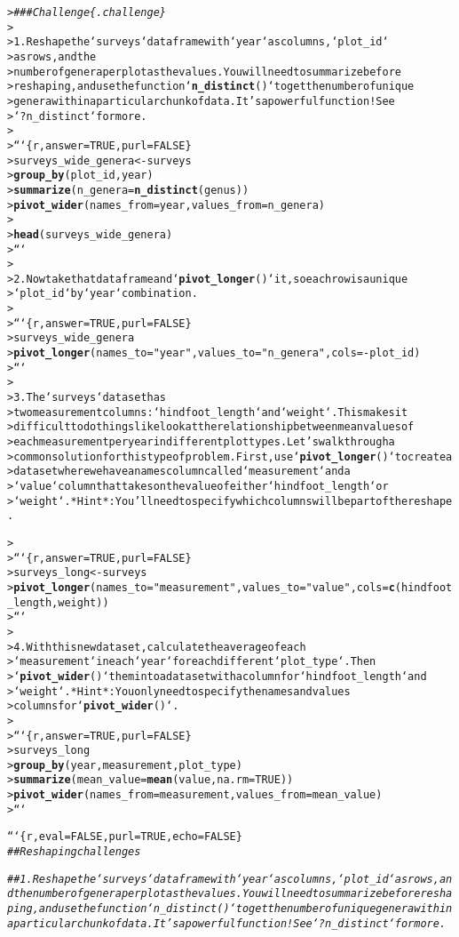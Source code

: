 \documentclass{article}\usepackage[]{graphicx}\usepackage[]{xcolor}
\makeatletter
\newcommand{\hlstr}[1]{\textcolor[rgb]{0.192,0.494,0.8}{#1}}%
\newcommand{\hlcom}[1]{\textcolor[rgb]{0.678,0.584,0.686}{\textit{#1}}}%
\newcommand{\hlkwd}[1]{\textcolor[rgb]{0.737,0.353,0.396}{\textbf{#1}}}%
\newenvironment{kframe}{%
 \def\at@end@of@kframe{}%
 \ifinner\ifhmode%
  \def\at@end@of@kframe{\end{minipage}}%
  \begin{minipage}{\columnwidth}%
 \fi\fi%
 \def\FrameCommand##1{\hskip\@totalleftmargin \hskip-\fboxsep
 \colorbox{shadecolor}{##1}\hskip-\fboxsep
     \hskip-\linewidth \hskip-\@totalleftmargin \hskip\columnwidth}%
 \MakeFramed {\advance\hsize-\width
   \@totalleftmargin\z@ \linewidth\hsize
   \@setminipage}}%
 {\par\unskip\endMakeFramed%
 \at@end@of@kframe}
\newenvironment{knitrout}{}{} %
\makeatother
\begin{document}
\begin{knitrout}
\begin{kframe}
\begin{alltt}
> \hlcom{### Challenge \{.challenge\}}
>
> 1. Reshape the `surveys` data frame with `year` as columns, `plot_id`
>   as rows, and the
>   number of genera per plot as the values. You will need to summarize before
>   reshaping, and use the function `\hlkwd{n_distinct}()` to get the number of unique
>   genera within a particular chunk of data. It's a powerful function! See
>   `?n_distinct` for more.
>
> ```\{r, answer=TRUE, purl=FALSE\}
> surveys_wide_genera <- surveys %>%
>   \hlkwd{group_by}(plot_id, year) %>%
>   \hlkwd{summarize}(n_genera = \hlkwd{n_distinct}(genus)) %>%
>   \hlkwd{pivot_wider}(names_from = year, values_from = n_genera)
>
> \hlkwd{head}(surveys_wide_genera)
> ```
>
> 2. Now take that data frame and `\hlkwd{pivot_longer}()` it, so each row is a unique
>    `plot_id` by `year` combination.
>
> ```\{r, answer=TRUE, purl=FALSE\}
> surveys_wide_genera %>%
>   \hlkwd{pivot_longer}(names_to = \hlstr{"year"}, values_to = \hlstr{"n_genera"}, cols = -plot_id)
> ```
>
> 3. The `surveys` data set has
>    two measurement columns: `hindfoot_length` and `weight`. This makes it
>    difficult to do things like look at the relationship between mean values of
>    each measurement per year in different plot types. Let's walk through a
>    common solution for this type of problem. First, use `\hlkwd{pivot_longer}()` to create a
>     dataset where we have a names column called `measurement` and a
>    `value` column that takes on the value of either `hindfoot_length` or
>    `weight`. *Hint*: You'll need to specify which columns will be part of the reshape.

>
> ```\{r, answer=TRUE, purl=FALSE\}
> surveys_long <- surveys %>%
>   \hlkwd{pivot_longer}(names_to = \hlstr{"measurement"}, values_to = \hlstr{"value"}, cols = \hlkwd{c}(hindfoot_length, weight))
> ```
>
> 4. With this new data set, calculate the average of each
>    `measurement` in each `year` for each different `plot_type`. Then
>    `\hlkwd{pivot_wider}()` them into a data set with a column for `hindfoot_length` and
>    `weight`. *Hint*: You only need to specify the names and values
>    columns for `\hlkwd{pivot_wider}()`.
>
> ```\{r, answer=TRUE, purl=FALSE\}
> surveys_long %>%
>   \hlkwd{group_by}(year, measurement, plot_type) %>%
>   \hlkwd{summarize}(mean_value = \hlkwd{mean}(value, na.rm=TRUE)) %>%
>   \hlkwd{pivot_wider}(names_from = measurement, values_from = mean_value)
> ```

```\{r, eval=FALSE, purl=TRUE, echo=FALSE\}
\hlcom{## Reshaping challenges}

\hlcom{## 1. Reshape the `surveys` data frame with `year` as columns, `plot_id` as rows, and the number of genera per plot as the values. You will need to summarize before reshaping, and use the function `n_distinct()` to get the number of unique genera within a particular chunk of data. It's a powerful function! See `?n_distinct` for more.}


\end{alltt}
\end{kframe}
\end{knitrout}
\end{document}
